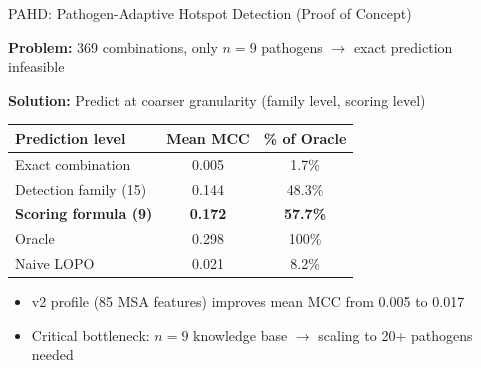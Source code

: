 \documentclass[aspectratio=169,11pt]{beamer}
\begin{document}
\begin{frame}{\textcolor{pahdgreen}{PAHD:} Pathogen-Adaptive Hotspot Detection (Proof of Concept)}

\textbf{Problem:} 369 combinations, only $n = 9$ pathogens $\to$ exact prediction infeasible

\vspace{0.5em}
\textbf{Solution:} Predict at coarser granularity (family level, scoring level)

\begin{center}
\begin{tabular}{lcc}
\toprule
\textbf{Prediction level} & \textbf{Mean MCC} & \textbf{\% of Oracle} \\
\midrule
Exact combination & 0.005 & 1.7\% \\
Detection family (15) & 0.144 & 48.3\% \\
\rowcolor{pahdgreen!12}
\textbf{Scoring formula (9)} & \textbf{0.172} & \textbf{57.7\%} \\
\midrule
Oracle & 0.298 & 100\% \\
Naive LOPO & 0.021 & 8.2\% \\
\bottomrule
\end{tabular}
\end{center}

\vspace{0.3em}
\begin{itemize}
  \item v2 profile (85 MSA features) improves mean MCC from 0.005 to \alert{0.017}
  \item Critical bottleneck: $n = 9$ knowledge base $\to$ scaling to 20+ pathogens needed
\end{itemize}
\end{frame}
\end{document}
